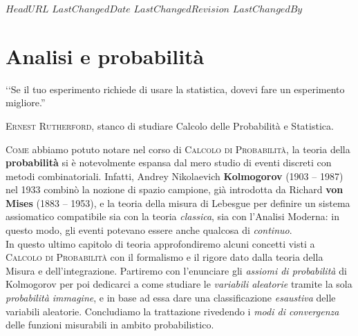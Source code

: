 \svnidlong
{$HeadURL$}
{$LastChangedDate$}
{$LastChangedRevision$}
{$LastChangedBy$}

\chapter{Analisi e probabilità}

\begin{introduction}
	‘‘Se il tuo esperimento richiede di usare la statistica, dovevi fare un esperimento migliore.''
	\begin{flushright}
		\textsc{Ernest Rutherford,} stanco di studiare Calcolo delle Probabilità e Statistica.
	\end{flushright}
\end{introduction}
\lettrine[findent=1pt, nindent=0pt]{C}{ome} abbiamo potuto notare nel corso di \textsc{Calcolo di Probabilità}, la teoria della \textbf{probabilità} si è notevolmente espansa dal mero studio di eventi discreti con metodi combinatoriali. Infatti, Andrey Nikolaevich \textbf{Kolmogorov} (1903 – 1987) nel 1933 combinò la nozione di spazio campione, già introdotta da Richard \textbf{von Mises} (1883 – 1953), e la teoria della misura di Lebesgue per definire un sistema assiomatico compatibile sia con la teoria \textit{classica}, sia con l'Analisi Moderna: in questo modo, gli eventi potevano essere anche qualcosa di \textit{continuo}.\\
In questo ultimo capitolo di teoria approfondiremo alcuni concetti visti a \textsc{Calcolo di Probabilità} con il formalismo e il rigore dato dalla teoria della Misura e dell'integrazione. Partiremo con l'enunciare gli \textit{assiomi di probabilità} di Kolmogorov per poi dedicarci a come studiare le \textit{variabili aleatorie} tramite la sola \textit{probabilità immagine}, e in base ad essa dare una classificazione \textit{esaustiva} delle variabili aleatorie. Concludiamo la trattazione rivedendo i \textit{modi di convergenza} delle funzioni misurabili in ambito probabilistico.
